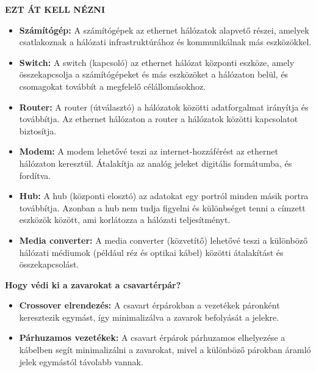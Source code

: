 \documentclass[12pt,a4paper]{article}
\begin{document}
            \begin{tcolorbox}[colback=blue!5!white,colframe=blue!50!black,title= 42. Ismertesse az ethernet hálózaton használt eszközöket!]
                                        \textbf{EZT ÁT KELL NÉZNI}   
                                        \begin{itemize}
                                            \item \textbf{Számítógép:} A számítógépek az ethernet hálózatok alapvető részei, amelyek csatlakoznak a hálózati infrastruktúrához és kommunikálnak más eszközökkel.
                                            \item \textbf{Switch:} A switch (kapcsoló) az ethernet hálózat központi eszköze, amely összekapcsolja a számítógépeket és más eszközöket a hálózaton belül, és csomagokat továbbít a megfelelő célállomásokhoz.
                                            \item \textbf{Router:} A router (útválasztó) a hálózatok közötti adatforgalmat irányítja és továbbítja. Az ethernet hálózaton a router a hálózatok közötti kapcsolatot biztosítja.
                                            \item \textbf{Modem:} A modem lehetővé teszi az internet-hozzáférést az ethernet hálózaton keresztül. Átalakítja az analóg jeleket digitális formátumba, és fordítva.
                                            \item \textbf{Hub:} A hub (központi elosztó) az adatokat egy portról minden másik portra továbbítja. Azonban a hub nem tudja figyelni és különbséget tenni a címzett eszközök között, ami korlátozza a hálózati teljesítményt.
                                            \item \textbf{Media converter:} A media converter (közvetítő) lehetővé teszi a különböző hálózati médiumok (például réz és optikai kábel) közötti átalakítást és összekapcsolást.
                                        \end{itemize}
                                        \textbf{Hogy védi ki a zavarokat a csavartérpár?}
                                        \begin{itemize}
                                            \item \textbf{Crossover elrendezés:} A csavart érpárokban a vezetékek páronként keresztezik egymást, így minimalizálva a zavarok befolyását a jelekre.
                                            \item \textbf{Párhuzamos vezetékek:} A csavart érpárok párhuzamos elhelyezése a kábelben segít minimalizálni a zavarokat, mivel a különböző párokban áramló jelek egymástól távolabb vannak.

\end{itemize}
\end{tcolorbox}
\end{document}
